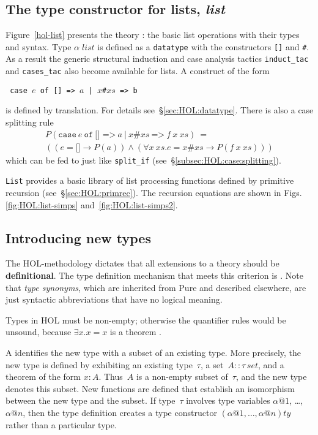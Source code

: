 \subsection{The type constructor for lists, \textit{list}}
\label{subsec:list}

Figure~\ref{hol-list} presents the theory : the basic list
operations with their types and syntax.  Type $\alpha \; list$ is
defined as a \texttt{datatype} with the constructors {\tt[]} and {\tt\#}.
As a result the generic structural induction and case analysis tactics
\texttt{induct\_tac} and \texttt{cases\_tac} also become available for
lists.  A  construct of the form
\begin{center}\tt
case $e$ of [] => $a$  |  \(x\)\#\(xs\) => b
\end{center}
is defined by translation.  For details see~{\S}\ref{sec:HOL:datatype}. There
is also a case splitting rule 
\[
\begin{array}{l}
P(\mathtt{case}~e~\mathtt{of}~\texttt{[] =>}~a ~\texttt{|}~
               x\texttt{\#}xs~\texttt{=>}~f~x~xs) ~= \\
((e = \texttt{[]} \to P(a)) \land
 (\forall x~ xs. e = x\texttt{\#}xs \to P(f~x~xs)))
\end{array}
\]
which can be fed to  just like
\texttt{split_if} (see~{\S}\ref{subsec:HOL:case:splitting}).

\texttt{List} provides a basic library of list processing functions defined by
primitive recursion (see~{\S}\ref{sec:HOL:primrec}).  The recursion equations
are shown in Figs.\ts\ref{fig:HOL:list-simps} and~\ref{fig:HOL:list-simps2}.



\subsection{Introducing new types} \label{sec:typedef}

The HOL-methodology dictates that all extensions to a theory should be
\textbf{definitional}.  The type definition mechanism that meets this
criterion is .  Note that \emph{type synonyms}, which are
inherited from Pure and described elsewhere, are just syntactic abbreviations
that have no logical meaning.

\begin{warn}
  Types in HOL must be non-empty; otherwise the quantifier rules would be
  unsound, because $\exists x. x=x$ is a theorem \cite[{\S}7]{paulson-COLOG}.
\end{warn}
A  identifies the new type with a subset of
an existing type.  More precisely, the new type is defined by
exhibiting an existing type~$\tau$, a set~$A::\tau\,set$, and a
theorem of the form $x:A$.  Thus~$A$ is a non-empty subset of~$\tau$,
and the new type denotes this subset.  New functions are defined that
establish an isomorphism between the new type and the subset.  If
type~$\tau$ involves type variables $\alpha@1$, \ldots, $\alpha@n$,
then the type definition creates a type constructor
$(\alpha@1,\ldots,\alpha@n)ty$ rather than a particular type.

